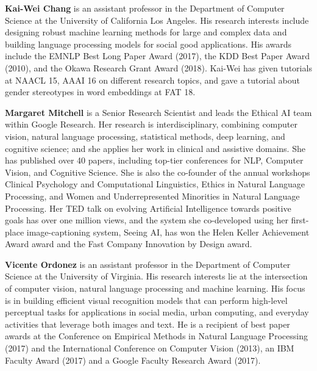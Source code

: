\clearpage
\begin{bio}

\textbf{Kai-Wei Chang} is an assistant professor in the Department of Computer Science at the University of California Los Angeles. His research interests include designing robust machine learning methods for large and complex data and building language processing models for social good applications. His awards include the EMNLP Best Long Paper Award (2017), the KDD Best Paper Award (2010), and the Okawa Research Grant Award (2018). Kai-Wei has given tutorials at NAACL 15, AAAI 16 on different research topics, and gave a tutorial about gender stereotypes in word embeddings at FAT 18. 


\textbf{Margaret Mitchell} is a Senior Research Scientist and leads the Ethical AI team within Google Research. Her research is interdisciplinary, combining computer vision, natural language processing, statistical methods, deep learning, and cognitive science; and she applies her work in clinical and assistive domains. She has published over 40 papers, including top-tier conferences for NLP, Computer Vision, and Cognitive Science. She is also the co-founder of the annual workshops Clinical Psychology and Computational Linguistics, Ethics in Natural Language Processing, and Women and Underrepresented Minorities in Natural Language Processing. Her TED talk on evolving Artificial Intelligence towards positive goals has over one million views, and the system she co-developed using her first-place image-captioning system, Seeing AI, has won the Helen Keller Achievement Award award and the Fast Company Innovation by Design award.


\textbf{Vicente Ordonez} is an assistant professor in the Department of Computer Science at the University of Virginia. His research interests lie at the intersection of computer vision, natural language processing and machine learning. His focus is in building efficient visual recognition models that can perform high-level perceptual tasks for applications in social media, urban computing, and everyday activities that leverage both images and text. He is a recipient of best paper awards at the Conference on Empirical Methods in Natural Language Processing (2017) and the International Conference on Computer Vision (2013), an IBM Faculty Award (2017) and a Google Faculty Research Award (2017).


\end{bio}
